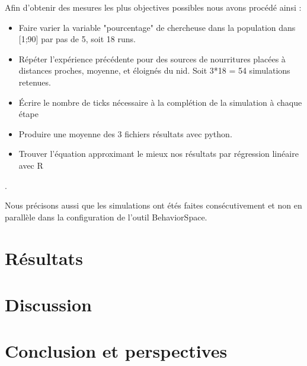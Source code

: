 \documentclass{article}
\begin{document}
Afin d'obtenir des mesures les plus objectives possibles nous avons procédé ainsi :
\begin{itemize}  
\item Faire varier la variable "pourcentage" de chercheuse dans la population dans [1;90] par pas de 5, soit 18 runs.
\item Répéter l'expérience précédente pour des sources de nourritures placées à distances  proches, moyenne, et éloignés du nid. Soit 3*18 = 54 simulations retenues.
\item Écrire le nombre de ticks nécessaire à la complétion de la simulation à chaque étape
\item Produire une moyenne des 3 fichiers résultats avec python.
\item Trouver l'équation approximant le mieux nos résultats par régression linéaire avec R
\end{itemize}.

Nous précisons aussi que les simulations ont étés faites consécutivement et non en parallèle dans la configuration de l'outil BehaviorSpace.

\section{Résultats}
\section{Discussion}
\section*{Conclusion et perspectives}
\end{document}
